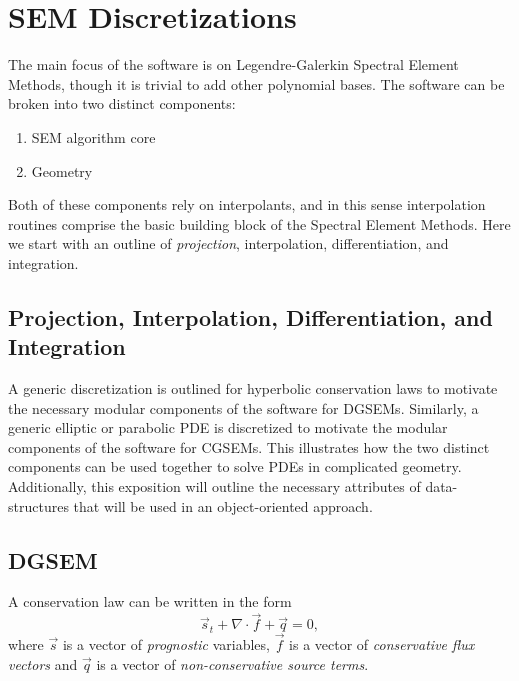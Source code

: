 \documentclass[12pt]{softwaremanual}
\begin{document}
\chapter{SEM Discretizations}
The main focus of the software is on Legendre-Galerkin Spectral Element Methods, though it is trivial to add other polynomial bases. The software can be broken into two distinct components:
\begin{enumerate}
\item SEM algorithm core
\item Geometry
\end{enumerate}
Both of these components rely on interpolants, and in this sense interpolation routines comprise the basic building block of the Spectral Element Methods. Here we start with an outline of \textit{projection}, interpolation, differentiation, and integration.

\section{Projection, Interpolation, Differentiation, and Integration}

A generic discretization is outlined for hyperbolic conservation laws to motivate the necessary modular components of the software for DGSEMs. Similarly, a generic elliptic or parabolic PDE is discretized to motivate the modular components of the software for CGSEMs. This illustrates how the two distinct components can be used together to solve PDEs in complicated geometry. Additionally, this exposition will outline the necessary attributes of data-structures that will be used in an object-oriented approach.

\section{DGSEM}\label{sec:DGSEMtheory}
A conservation law can be written in the form
  \begin{equation}
 \vec{s}_t + \nabla \cdot \vec{f} + \vec{q} = 0, \label{eq:ConservationForm}
 \end{equation}
 where $\vec{s}$ is a vector of \textit{prognostic} variables, $\vec{f}$ is a vector of \textit{conservative flux vectors} and $\vec{q}$ is a vector of \textit{non-conservative source terms}.
 
\end{document}
